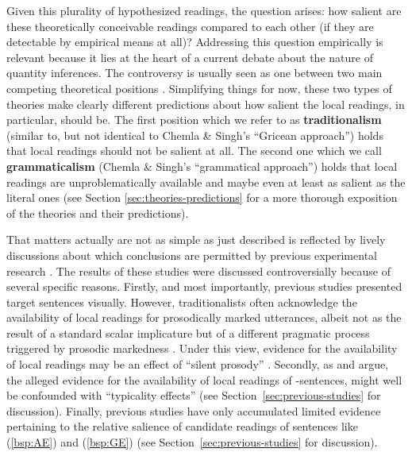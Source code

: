 \documentclass[fleqn,reqno,10pt]{article}
\newcommand{\as}{\acro{as}}
\renewcommand{\mymark}[1]{\textbf{#1}}
\begin{document}
Given this plurality of hypothesized readings, the question arises:
how salient are these theoretically conceivable readings
compared to each other (if they are detectable by empirical means at
all)?  Addressing this question empirically is relevant because it
lies at the heart of a current debate about the nature of quantity
inferences. %
The controversy is usually seen as one between two main competing
theoretical positions \citep[see][for a detailed comparison of the
two]{ChemlaSingh2014:Remarks-on-the-}.  Simplifying things for now,
these two types of theories make clearly different predictions about
how salient the local readings, in particular, should be.  The first
position which we refer to as \mymark{traditionalism} (similar to, but
not identical to Chemla \& Singh’s ``Gricean approach'') holds that
local readings should not be salient at all. The second one which we
call \mymark{grammaticalism} (Chemla \& Singh’s ``grammatical
approach'') holds that local readings are unproblematically available
and maybe even at least as salient as the literal ones (see Section
\ref{sec:theories-predictions} for a more thorough exposition of the
theories and their predictions).

That matters actually are not as simple as just described is reflected
by lively discussions about which conclusions are permitted by previous
experimental research \citep[e.g.][]{GeurtsPouscoulous2009:Embedded-Implic,CliftonDube2010:Embedded-Implic,ChemlaSpector2010:Experimental-Ev,BenzGotzner2014:Embedded-implic}. The results of these studies
were discussed controversially because of several specific reasons. Firstly,
and most importantly, previous studies presented target sentences visually.
However, traditionalists often acknowledge the availability of local readings for
prosodically marked utterances, albeit not as the result of
a standard scalar implicature but of a different pragmatic process triggered by
prosodic markedness \citep[e.g.][]{Horn2006:The-Border-Wars,Geurts2009:Scalar-Implicat,ChemlaSpector2010:Experimental-Ev,Geurts2010:Quantity-Implic,Tielvan-Tiel2012:Embedded-Scalar,GeurtsTielvan-Tiel2013:Embedded-Scalar}. Under this view, evidence for the availability of local readings \citep[see][]{CliftonDube2010:Embedded-Implic,ChemlaSpector2010:Experimental-Ev} may be
an effect of “silent prosody”  \citep[see e.g.][]{Bader98,Fodor98}. Secondly, as \citet{Tielvan-Tiel2012:Embedded-Scalar} and \citet{GeurtsTielvan-Tiel2013:Embedded-Scalar} argue,
the alleged evidence for the availability of local readings of \as-sentences, might well be
confounded with “typicality effects”  (see Section~\ref{sec:previous-studies} for discussion).
Finally, previous studies have only accumulated limited evidence pertaining to the relative
salience of candidate readings of sentences like (\ref{bsp:AE}) and (\ref{bsp:GE}) (see
Section~\ref{sec:previous-studies} for discussion). 
\end{document}
